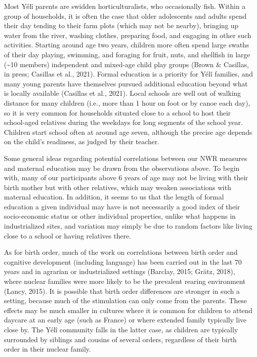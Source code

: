 \documentclass[
  american,
  ,man,floatsintext]{apa6}
\begin{document}
Most Yélî parents are swidden horticulturalists, who occasionally fish. Within a group of households, it is often the case that older adolescents and adults spend their day tending to their farm plots (which may not be nearby), bringing up water from the river, washing clothes, preparing food, and engaging in other such activities. Starting around age two years, children more often spend large swaths of their day playing, swimming, and foraging for fruit, nuts, and shellfish in large (\textasciitilde10 members) independent and mixed-age child play groups (Brown \& Casillas, in press; Casillas et al., 2021). Formal education is a priority for Yélî families, and many young parents have themselves pursued additional education beyond what is locally available (Casillas et al., 2021). Local schools are well out of walking distance for many children (i.e., more than 1 hour on foot or by canoe each day), so it is very common for households situated close to a school to host their school-aged relatives during the weekdays for long segments of the school year. Children start school often at around age seven, although the precise age depends on the child's readiness, as judged by their teacher.

Some general ideas regarding potential correlations between our NWR measures and maternal education may be drawn from the observations above. To begin with, many of our participants above 6 years of age may not be living with their birth mother but with other relatives, which may weaken associations with maternal education.
In addition, it seems to us that the length of formal education a given individual may have is not necessarily a good index of their socio-economic status or other individual properties, unlike what happens in industrialized sites, and variation may simply be due to random factors like living close to a school or having relatives there.

As for birth order, much of the work on correlations between birth order and cognitive development (including language) has been carried out in the last 70 years and in agrarian or industrialized settings (Barclay, 2015; Grätz, 2018), where nuclear families were more likely to be the prevalent rearing environment (Lancy, 2015). It is possible that birth order differences are stronger in such a setting, because much of the stimulation can only come from the parents. These effects may be much smaller in cultures where it is common for children to attend daycare at an early age (such as France) or where extended family typically live close by. The Yélî community falls in the latter case, as children are typically surrounded by siblings and cousins of several orders, regardless of their birth order in their nuclear family.
\end{document}
